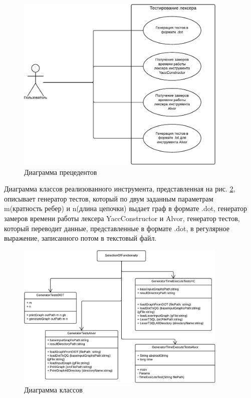 \documentclass{matmex-diploma}
\begin{document}
\begin{enumerate}
\begin{figure}[h!]
\begin{center}
\includegraphics[width=0.9\textwidth]{dpo}
\caption{Диаграмма прецедентов}
\label{fig:dpo} 
\end{center}
\end{figure}
	
Диаграмма классов реализованного инструмента, представленная на рис. \ref{fig:dco}, описывает  генератор тестов, который по двум заданным параметрам \\ 
m(кратность ребер) и n(длина цепочки) выдает граф в формате .dot, генератор замеров времени работы лексера YaccConstructor и Alvor, 
генератор тестов, который переводит данные, представленные в формате .dot, в регулярное выражение, записанного потом в текстовый файл. 

\begin{figure}[h!]
\begin{center}
\includegraphics[width=0.9\textwidth]{dco}
\caption{Диаграмма классов }
\label{fig:dco} 
\end{center}
\end{figure}


\end{enumerate}
\end{document}
